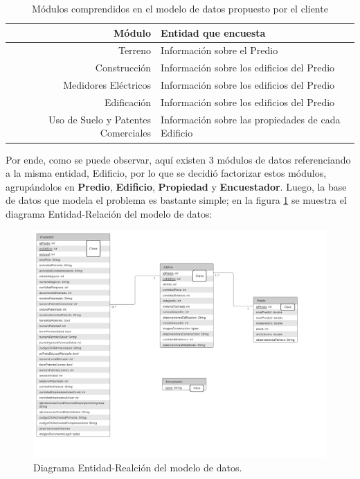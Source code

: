 \begin{table}[h!]
\centering
\caption{Módulos comprendidos en el modelo de datos propuesto por el cliente}
\label{tab:modulosAnteriores} %
\begin{tabular}{|r|l|}
    \toprule
    \textbf{Módulo}                     & \textbf{Entidad que encuesta}                      \\
    \midrule
    Terreno                             & Información sobre el Predio                        \\
    Construcción                        & Información sobre los edificios del Predio         \\
    Medidores Eléctricos                & Información sobre los edificios del Predio         \\
    Edificación                         & Información sobre los edificios del Predio         \\
    Uso de Suelo y Patentes Comerciales & Información sobre las propiedades de cada Edificio \\
    \bottomrule %
\end{tabular}
\end {table}
Por ende, como se puede observar, aquí existen 3 módulos de datos referenciando a la misma entidad, Edificio, por lo que se decidió factorizar estos módulos, agrupándolos en
\textbf{Predio}, \textbf{Edificio}, \textbf{Propiedad} y \textbf{Encuestador}.
Luego, la base de datos que modela el problema es bastante simple; en la figura \ref{fig:figura16} se muestra el diagrama Entidad-Relación del modelo de datos:
\begin{figure}[h]
    \centering
    \includegraphics[scale=0.5]{Graphics/Capitulo 3/DiagramaER.png}
    \caption{Diagrama Entidad-Realción del modelo de datos.} %
    \label{fig:figura16}
\end{figure}
